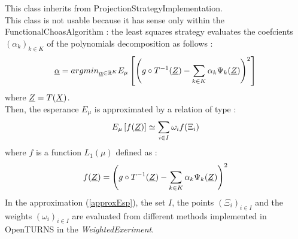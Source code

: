 This class inherits from ProjectionStrategyImplementation.\\

This class is not usable because it has sense only within the FunctionalChoasAlgorithm : the least squares strategy evaluates the coefcients $(\alpha_k)_{k \in K}$ of the polynomials decomposition as follows :
\begin{equation}\label{defArgMin}
{\underline{\alpha}} = argmin_{{\underline{\alpha}} \in {\mathbb R}^K} E_{\mu} \left[ \left( g \circ T^{-1}({\underline{Z}}) -  \sum_{k \in K} \alpha_k \Psi_k ({\underline{Z}})\right)^2  \right]
\end{equation}
where ${\underline{Z}} = T({\underline{X}})$.\\
Then, the esperance $ E_{\mu}$ is approximated by a relation of type :
\begin{equation}\label{approxEsp}
E_{\mu} \left[ f({\underline{Z}}) \right] \simeq \sum_{i \in I} \omega_i f(\Xi_i)
\end{equation}
where $f$ is a function $L_1(\mu)$ defined as :
\begin{equation}\label{fArgMin}
f({\underline{Z}}) = \left( g \circ T^{-1}({\underline{Z}}) -  \sum_{k \in K} \alpha_k \Psi_k ({\underline{Z}})\right)^2
\end{equation}
In the approximation (\ref{approxEsp}), the set $I$, the points $(\Xi_i)_{i \in I}$ and the weights $(\omega_i)_{i \in I}$ are evaluated from different methods implemented in OpenTURNS in the \emph{WeightedExeriment}.


